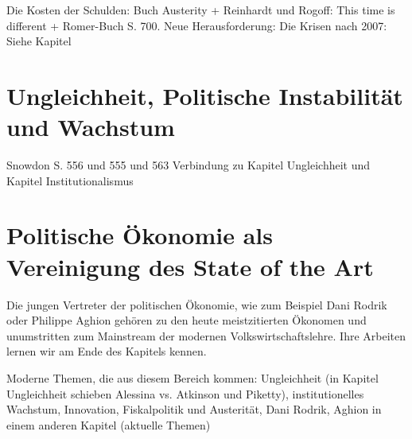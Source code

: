 Die Kosten der Schulden:
Buch Austerity + Reinhardt und Rogoff: This time is different + Romer-Buch S. 700.
Neue Herausforderung: Die Krisen nach 2007: Siehe Kapitel 



\section{Ungleichheit, Politische Instabilität und Wachstum}
Snowdon S. 556 und 555 und 563 Verbindung zu Kapitel Ungleichheit und Kapitel Institutionalismus

\textcite{Alesina1996}
\textcite{Alesina1994}
\textcite{Deininger1996}
\textcite{Aghion1999}
\textcite{Hirschman1973}
\textcite{Alesina1994a}




\section{Politische Ökonomie als Vereinigung des State of the Art}

Die jungen Vertreter der politischen Ökonomie, wie zum Beispiel Dani Rodrik oder Philippe Aghion gehören zu den heute meistzitierten Ökonomen und unumstritten zum Mainstream der modernen Volkswirtschaftslehre. Ihre Arbeiten lernen wir am Ende des Kapitels kennen. 








Moderne Themen, die aus diesem Bereich kommen: Ungleichheit (in Kapitel Ungleichheit schieben Alessina vs. Atkinson und Piketty), institutionelles Wachstum, Innovation, Fiskalpolitik und Austerität, Dani Rodrik, Aghion in einem anderen Kapitel (aktuelle Themen)










